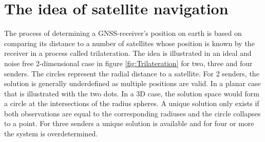 \section{The idea of satellite navigation}\label{IdeaSatNav}
The process of determining a GNSS-receiver's position on earth is based on comparing its distance to a number of satellites whose position is known by the receiver in a process called trilateration. The idea is illustrated in an ideal and noise free 2-dimensional case in figure \ref{fig:Trilateration} for two, three and four senders. The circles represent the radial distance to a satellite. For 2 senders, the solution is generally underdefined as multiple positions are valid. In a planar case that is illustrated with the two dots. In a 3D case, the solution space would form a circle at the intersections of the radius spheres. A unique solution only exists if both observations are equal to the corresponding radiuses and the circle collapses to a point. For three senders a unique solution is available and for four or more the system is overdetermined.
